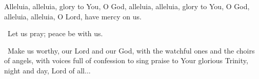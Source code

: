 \documentclass[12pt,twoside,a5paper]{article}
\begin{document}

\begin{halfparskip}
  Alleluia, alleluia, glory to You, O God, alleluia, alleluia, glory to You, O God, alleluia, alleluia, O Lord, have mercy on us.
\end{halfparskip}

\dd~Let us pray; peace be with us.

\cc~Make us worthy, our Lord and our God, with the watchful ones and the choirs of angels, with voices full of confession to sing praise to Your glorious Trinity, night and day, Lord of all...

\end{document}
